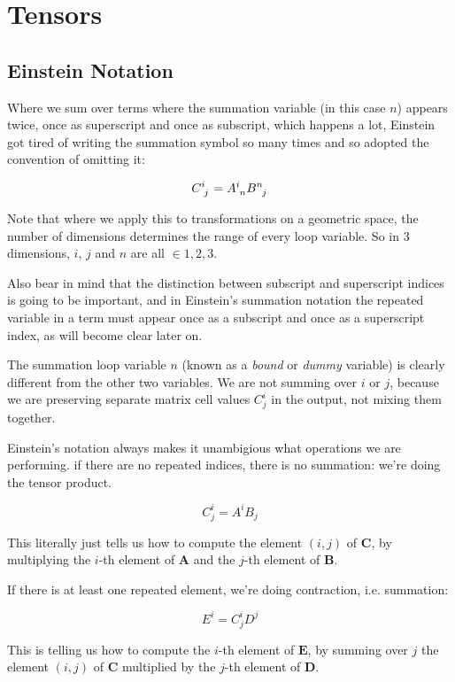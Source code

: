 \chapter{Tensors} \label{ch:tensors}

\section{Einstein Notation}

Where we sum over terms where the summation variable (in this case $n$) appears twice, once as superscript and once as subscript, which happens a lot, Einstein got tired of writing the summation symbol so many times and so adopted the convention of omitting it:

$$C\indices{^i_j} = A\indices{^i_n}B\indices{^n_j}$$

Note that where we apply this to transformations on a geometric space, the number of dimensions determines the range of every loop variable. So in 3 dimensions, $i$, $j$ and $n$ are all $\in {1, 2, 3}$.

Also bear in mind that the distinction between subscript and superscript indices is going to be important, and in Einstein's summation notation the repeated variable in a term must appear once as a subscript and once as a superscript index, as will become clear later on.

The summation loop variable $n$ (known as a \textit{bound} or \textit{dummy} variable) is clearly different from the other two variables. We are not summing over $i$ or $j$, because we are preserving separate matrix cell values $C^i_j$ in the output, not mixing them together.

Einstein's notation always makes it unambigious what operations we are performing. if there are no repeated indices, there is no summation: we're doing the tensor product.

$$C^i_j = A^iB_{j}$$

This literally just tells us how to compute the element $(i, j)$ of $\boldsymbol{C}$, by multiplying the $i$-th element of $\boldsymbol{A}$ and the $j$-th element of $\boldsymbol{B}$.

If there is at least one repeated element, we're doing contraction, i.e. summation:

$$E^i = C^i_jD^j$$

This is telling us how to compute the $i$-th element of $\boldsymbol{E}$, by summing over $j$ the element $(i, j)$ of $\boldsymbol{C}$ multiplied by the $j$-th element of $\boldsymbol{D}$.

